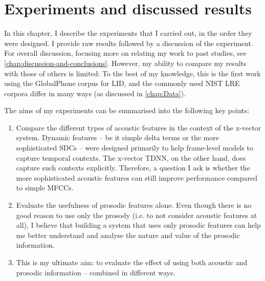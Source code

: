\documentclass[bsc,frontabs,twoside,singlespacing,parskip,deptreport]{infthesis}
\begin{document}
\chapter{Experiments and discussed results}{
  \label{chap:Experiments}

  In this chapter, I describe the experiments that I carried out, in the order they were designed. I provide raw results followed by a discussion of the experiment. For overall discussion, focusing more on relating my work to past studies, see \autoref{chap:discussion-and-conclusions}. However, my ability to compare my results with those of others is limited: To the best of my knowledge, this is the first work using the GlobalPhone corpus for LID, and the commonly used NIST LRE corpora differ in many ways (as discussed in \autoref{chap:Data}).

  The aims of my experiments can be summarised into the following key points:
  \begin{enumerate}
    \item {Compare the different types of acoustic features in the context of the x-vector system. Dynamic features -- be it simple delta terms or the more sophisticated SDCs -- were designed primarily to help frame-level models to capture temporal contexts. The x-vector TDNN, on the other hand, does capture such contexts explicitly. Therefore, a question I ask is whether the more sophisticated acoustic features can still improve performance compared to simple MFCCs.}
    
    \item {Evaluate the usefulness of prosodic features alone. Even though there is no good reason to use only the prosody (i.e. to not consider acoustic features at all), I believe that building a system that uses only prosodic features can help me better understand and analyse the nature and value of the prosodic information.}
    
    \item {This is my ultimate aim: to evaluate the effect of using both acoustic and prosodic information -- combined in different ways.}
  \end{enumerate}


}
\end{document}
